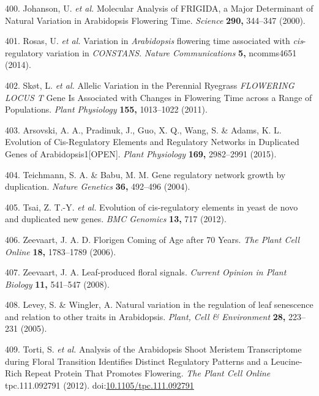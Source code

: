 \documentclass[12pt,]{book}
\begin{document}
\hypertarget{ref-johanson_molecular_2000}{}
400. Johanson, U. \emph{et al.} Molecular Analysis of FRIGIDA, a Major
Determinant of Natural Variation in Arabidopsis Flowering Time.
\emph{Science} \textbf{290,} 344--347 (2000).

\hypertarget{ref-rosas_variation_2014}{}
401. Rosas, U. \emph{et al.} Variation in \emph{Arabidopsis} flowering
time associated with \emph{cis}-regulatory variation in \emph{CONSTANS}.
\emph{Nature Communications} \textbf{5,} ncomms4651 (2014).

\hypertarget{ref-skot_allelic_2011}{}
402. Skøt, L. \emph{et al.} Allelic Variation in the Perennial Ryegrass
\emph{FLOWERING LOCUS T} Gene Is Associated with Changes in Flowering
Time across a Range of Populations. \emph{Plant Physiology}
\textbf{155,} 1013--1022 (2011).

\hypertarget{ref-arsovski_evolution_2015}{}
403. Arsovski, A. A., Pradinuk, J., Guo, X. Q., Wang, S. \& Adams, K. L.
Evolution of Cis-Regulatory Elements and Regulatory Networks in
Duplicated Genes of Arabidopsis1{[}OPEN{]}. \emph{Plant Physiology}
\textbf{169,} 2982--2991 (2015).

\hypertarget{ref-teichmann_gene_2004}{}
404. Teichmann, S. A. \& Babu, M. M. Gene regulatory network growth by
duplication. \emph{Nature Genetics} \textbf{36,} 492--496 (2004).

\hypertarget{ref-tsai_evolution_2012}{}
405. Tsai, Z. T.-Y. \emph{et al.} Evolution of cis-regulatory elements
in yeast de novo and duplicated new genes. \emph{BMC Genomics}
\textbf{13,} 717 (2012).

\hypertarget{ref-zeevaart_florigen_2006}{}
406. Zeevaart, J. A. D. Florigen Coming of Age after 70 Years. \emph{The
Plant Cell Online} \textbf{18,} 1783--1789 (2006).

\hypertarget{ref-zeevaart_leaf_produced_2008}{}
407. Zeevaart, J. A. Leaf-produced floral signals. \emph{Current Opinion
in Plant Biology} \textbf{11,} 541--547 (2008).

\hypertarget{ref-levey_natural_2005}{}
408. Levey, S. \& Wingler, A. Natural variation in the regulation of
leaf senescence and relation to other traits in Arabidopsis.
\emph{Plant, Cell \& Environment} \textbf{28,} 223--231 (2005).

\hypertarget{ref-torti_analysis_2012}{}
409. Torti, S. \emph{et al.} Analysis of the Arabidopsis Shoot Meristem
Transcriptome during Floral Transition Identifies Distinct Regulatory
Patterns and a Leucine-Rich Repeat Protein That Promotes Flowering.
\emph{The Plant Cell Online} tpc.111.092791 (2012).
doi:\href{https://doi.org/10.1105/tpc.111.092791}{10.1105/tpc.111.092791}
\end{document}
